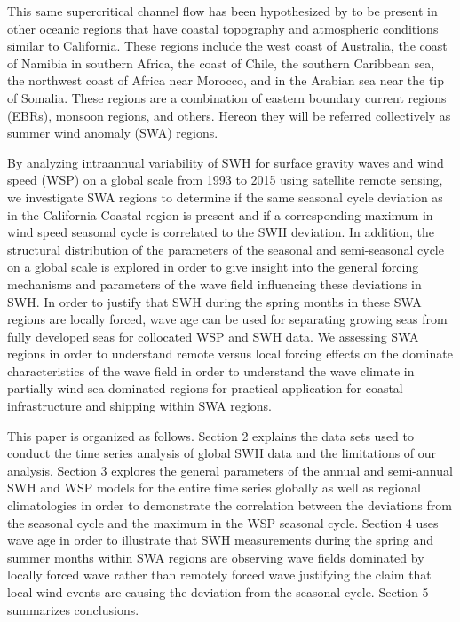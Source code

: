 \documentclass[draft,linenumbers]{agujournal2018}
\begin{document}
This same supercritical channel flow has been hypothesized by \citet{winant1988marine} to be present in other oceanic regions that have coastal topography and atmospheric conditions similar to California. These regions include the west coast of Australia, the coast of Namibia in southern Africa, the coast of Chile, the southern Caribbean sea, the northwest coast of Africa near Morocco, and in the Arabian sea near the tip of Somalia. These regions are a combination of eastern boundary current regions (EBRs), monsoon regions, and others. Hereon they will be referred collectively as summer wind anomaly (SWA) regions. 

By analyzing intraannual variability of SWH for surface gravity waves and wind speed (WSP) on a global scale from 1993 to 2015 using satellite remote sensing, we investigate SWA regions to determine if the same seasonal cycle deviation as in the California Coastal region is present and if a corresponding maximum in wind speed seasonal cycle is correlated to the SWH deviation. In addition, the structural distribution of the parameters of the seasonal and semi-seasonal cycle on a global scale is explored in order to give insight into the general forcing mechanisms and parameters of the wave field influencing these deviations in SWH\@. In order to justify that SWH during the spring months in these SWA regions are locally forced, wave age can be used for separating growing seas from fully developed seas for collocated WSP and SWH data. We assessing SWA regions in order to understand remote versus local forcing effects on the dominate characteristics of the wave field in order to understand the wave climate in partially wind-sea dominated regions for practical application for coastal infrastructure and shipping within SWA regions.

This paper is organized as follows. Section 2 explains the data sets used to conduct the time series analysis of global SWH data and the limitations of our analysis. Section 3 explores the general parameters of the annual and semi-annual SWH and WSP models for the entire time series globally as well as regional climatologies in order to demonstrate the correlation between the deviations from the seasonal cycle and the maximum in the WSP seasonal cycle. Section 4 uses wave age in order to illustrate that SWH measurements during the spring and summer months within SWA regions are observing wave fields dominated by locally forced wave rather than remotely forced wave justifying the claim that local wind events are causing the deviation from the seasonal cycle. Section 5 summarizes conclusions.
\end{document}
